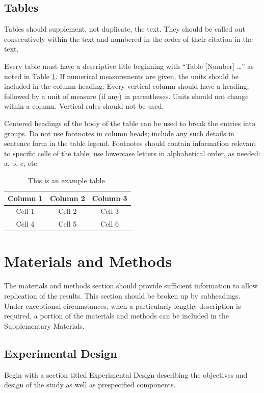 \documentclass{article}
\begin{document}
\subsection*{Tables}
Tables should supplement, not duplicate, the text. They should be called out consecutively within the text and numbered in the order of their citation in the text. 

Every table must have a descriptive title beginning with ``Table [Number] …'' as noted in Table \ref{tab:1}. If numerical measurements are given, the units should be included in the column heading. Every vertical column should have a heading, followed by a unit of measure (if any) in parentheses. Units should not change within a column. Vertical rules should not be used. 

Centered headings of the body of the table can be used to break the entries into groups. Do not use footnotes in column heads; include any such details in sentence form in the table legend. Footnotes should contain information relevant to specific cells of the table; use lowercase letters in alphabetical order, as needed: a, b, c, etc. 

\begin{table}[b]
    \caption{This is an example table.}    
    \centering
    \begin{tabular}{ccc}
            \hline
            Column 1 & Column 2 & Column 3 \\  
            \hline
            Cell 1 & Cell 2 & Cell 3\\ 
            Cell 4 & Cell 5 & Cell 6 \\
            \hline
            \end{tabular}

    \label{tab:1}
\end{table}

\section{Materials and Methods}
The materials and methods section should provide sufficient information to allow replication of the results. This section should be broken up by subheadings. Under exceptional circumstances, when a particularly lengthy description is required, a portion of the materials and methods can be included in the Supplementary Materials. 

\subsection{Experimental Design}
Begin with a section titled Experimental Design describing the objectives and design of the study as well as prespecified components. 
\end{document}
